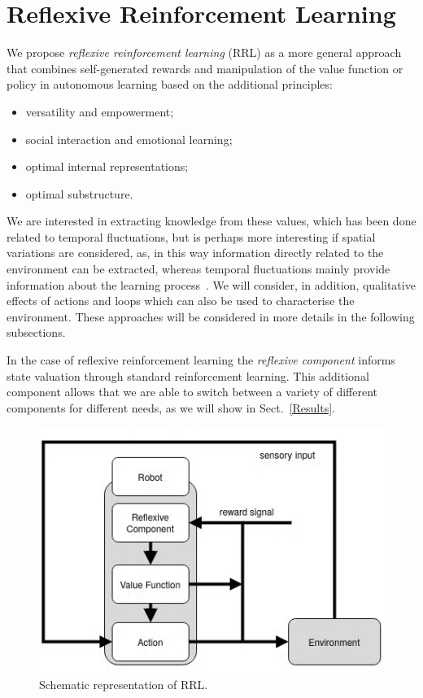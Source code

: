 \documentclass{article}
\begin{document}
\section{Reflexive Reinforcement Learning}
We propose \emph{reflexive reinforcement learning} (RRL) as a more general approach that combines self-generated rewards and manipulation of the
value function or policy in autonomous learning based on the additional principles:
\begin{itemize}
\item versatility and empowerment;
\item social interaction and emotional learning;
\item optimal internal representations;
\item optimal substructure.
\end{itemize}

We are interested in extracting knowledge from these values, which has been done
related to temporal fluctuations, but %
is perhaps more interesting if spatial variations are considered, as, in this way information directly
related to the environment can be extracted, whereas temporal fluctuations mainly provide
information about the learning process~\citep{herrmann1995efficient}. We will consider, in addition, qualitative effects of actions and loops which can also be used to characterise the environment. These approaches will be considered in more details 
in the following subsections.
\cite{balakrishnan2019incorporating}

In the case of reflexive reinforcement learning the \emph{reflexive component} informs state valuation through standard reinforcement learning. This additional component allows that we are able to switch between a variety of different components for different needs, as we will show in Sect.~\ref{Results}.

\begin{figure}[ht] 
\centering
\includegraphics[scale=0.45]{pics/RRLfig.jpg} 
	\caption{Schematic representation of RRL.\label{rrlfig}}
\end{figure}
\end{document}

